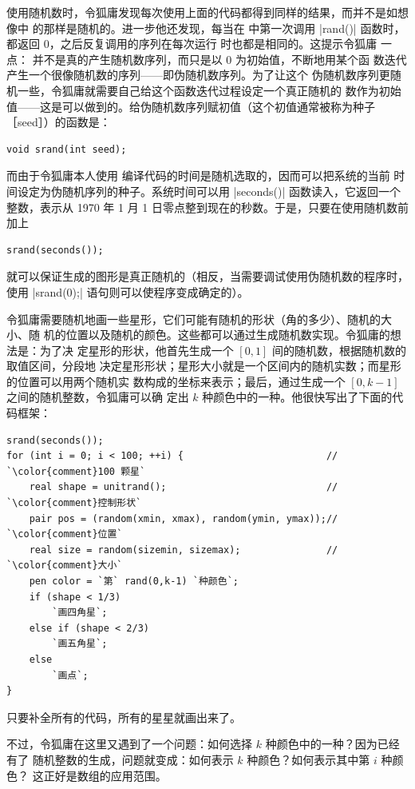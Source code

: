 使用随机数时，令狐庸发现每次使用上面的代码都得到同样的结果，而并不是如想像中
的那样是随机的。进一步他还发现，每当在 \Asy{} 中第一次调用 |rand()| 函数时，
都返回 $0$，之后反复调用的序列在每次运行 \Asy{} 时也都是相同的。这提示令狐庸
一点：\Asy{} 并不是真的产生随机数序列，而只是以 $0$ 为初始值，不断地用某个函
数迭代产生一个很像随机数的序列——即伪随机数序列。为了让这个
伪随机数序列更随机一些，令狐庸就需要自己给这个函数迭代过程设定一个真正随机的
数作为初始值——这是可以做到的。给伪随机数序列赋初值（这个初值通常被称为种子
［seed］）的函数是：
\begin{lstlisting}
void srand(int seed);
\end{lstlisting}
而由于令狐庸本人使用 \Asy{} 编译代码的时间是随机选取的，因而可以把系统的当前
时间设定为伪随机序列的种子。系统时间可以用 |seconds()|
 函数读入，它返回一个整数，表示从 1970 年
1 月 1 日零点整到现在的秒数。于是，只要在使用随机数前加上
\begin{lstlisting}
srand(seconds());
\end{lstlisting}
就可以保证生成的图形是真正随机的（相反，当需要调试使用伪随机数的程序时，使用
|srand(0);| 语句则可以使程序变成确定的）。

令狐庸需要随机地画一些星形，它们可能有随机的形状（角的多少）、随机的大小、随
机的位置以及随机的颜色。这些都可以通过生成随机数实现。令狐庸的想法是：为了决
定星形的形状，他首先生成一个 $[0,1]$ 间的随机数，根据随机数的取值区间，分段地
决定星形形状；星形大小就是一个区间内的随机实数；而星形的位置可以用两个随机实
数构成的坐标来表示；最后，通过生成一个 $[0,k-1]$ 之间的随机整数，令狐庸可以确
定出 $k$ 种颜色中的一种。他很快写出了下面的代码框架：
\begin{lstlisting}
srand(seconds());
for (int i = 0; i < 100; ++i) {                         // `\color{comment}100 颗星`
    real shape = unitrand();                            // `\color{comment}控制形状`
    pair pos = (random(xmin, xmax), random(ymin, ymax));// `\color{comment}位置`
    real size = random(sizemin, sizemax);               // `\color{comment}大小`
    pen color = `第` rand(0,k-1) `种颜色`;
    if (shape < 1/3)
        `画四角星`;
    else if (shape < 2/3)
        `画五角星`;
    else
        `画点`;
}
\end{lstlisting}
只要补全所有的代码，所有的星星就画出来了。

不过，令狐庸在这里又遇到了一个问题：如何选择 $k$ 种颜色中的一种？因为已经有了
随机整数的生成，问题就变成：如何表示 $k$ 种颜色？如何表示其中第 $i$ 种颜色？
这正好是数组的应用范围。


